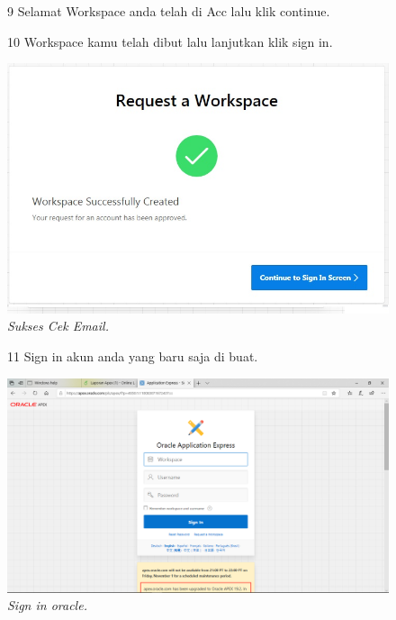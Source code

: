 \begin{enumerate}
\begin{figure}
\item[9] Selamat Workspace anda telah di Acc lalu klik continue.

  
\label{gambar}
\end{figure}

\begin{figure}
\item[10] Workspace kamu telah dibut lalu lanjutkan klik sign in.

    \begin{center}
\includegraphics[scale=0.5]{figures/req8.jpg}
    \caption{\textit{Sukses Cek Email.}}
        \end{center}
\label{gambar}
\end{figure}

\begin{figure}
\item[11] Sign in akun anda yang baru saja di buat.

    \begin{center}
\includegraphics[scale=0.5]{figures/req9.png}
    \caption{\textit{Sign in oracle.}}
        \end{center}
\label{gambar}
\end{figure}


\end{enumerate}
